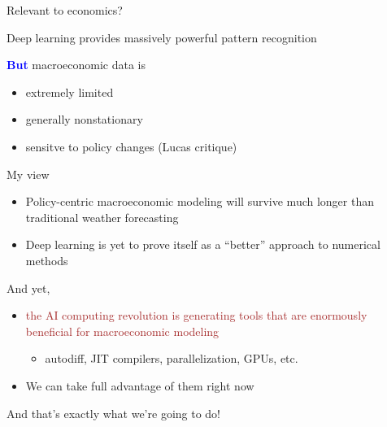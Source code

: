 \documentclass[
    xcolor={svgnames,dvipsnames},
    hyperref={colorlinks, citecolor=DeepPink4, linkcolor=DarkRed, urlcolor=DarkBlue}
    ]{beamer}  %
\newcommand{\navy}[1]{\textcolor{Blue}{\bf #1}}
\newcommand{\brown}[1]{\textcolor{Brown}{\sf #1}}
\newcommand{\1}{\mathbbm 1}
\begin{document}
\begin{frame}
    

    Relevant to economics?

    \vspace{0.5em}
    \pause
    Deep learning provides massively powerful pattern recognition

    \pause
    \vspace{0.5em}
    \vspace{0.5em}
    \vspace{0.5em}
    \navy{But} macroeconomic data is 

    \begin{itemize}
        \item extremely limited 
        \vspace{0.5em}
        \item generally nonstationary
        \vspace{0.5em}
        \item sensitve to policy changes (Lucas critique)
    \end{itemize}



\end{frame}


\begin{frame}
    
    My view

    \begin{itemize}
        \item Policy-centric macroeconomic modeling will survive much longer
            than traditional weather forecasting
        \vspace{0.5em}
        \item Deep learning is yet to prove itself as a ``better'' approach to
            numerical methods
        \vspace{0.5em}
    \end{itemize}

    \pause
    And yet, 

    \begin{itemize}
        \item \brown{the AI computing revolution is
            generating tools that are enormously beneficial for macroeconomic
        modeling}
        \vspace{0.5em}
            \begin{itemize}
                \item autodiff, JIT compilers, parallelization, GPUs, etc.
            \end{itemize}
        \vspace{0.5em}
        \item We can take full advantage of them right now
    \end{itemize}

        \vspace{0.5em}
        \vspace{0.5em}
        \pause
    And that's exactly what we're going to do!


\end{frame}
\end{document}
